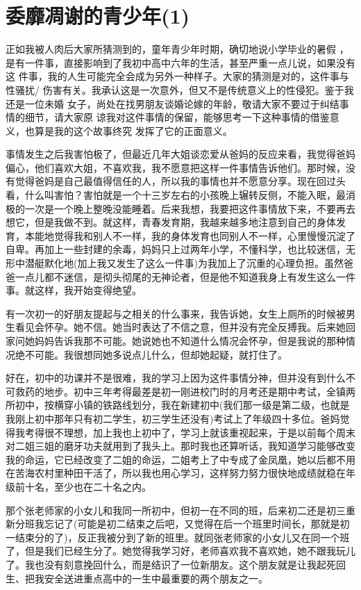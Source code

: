 \documentclass[12pt]{book}
\begin{document}
\section{委靡凋谢的青少年(1)}
\label{sec-2-5}

        正如我被人肉后大家所猜测到的，童年青少年时期，确切地说小学毕业的暑假
，是有一件事，直接影响到了我初中高中六年的生活，甚至严重一点儿说，如果没有这
件事，我的人生可能完全会成为另外一种样子。大家的猜测是对的，这件事与性骚扰/
伤害有关。我承认这是一次意外，但又不是传统意义上的性侵犯。鉴于我还是一位未婚
女子，尚处在找男朋友谈婚论嫁的年龄，敬请大家不要过于纠结事情的细节，请大家原
谅我对这件事情的保留，能够思考一下这种事情的借鉴意义，也算是我的这个故事终究
发挥了它的正面意义。

事情发生之后我害怕极了，但最近几年大姐谈恋爱从爸妈的反应来看，我觉得爸妈偏心，他们喜欢大姐，不喜欢我，我不愿意把这样一件事情告诉他们。那时候，没有觉得爸妈是自己最值得信任的人，所以我的事情也并不愿意分享。现在回过头看，什么叫害怕？害怕就是一个十三岁左右的小孩晚上辗转反侧，不能入眠，最消极的一次是一个晚上整晚没能睡着。后来我想，我要把这件事情放下来，不要再去想它，但是我做不到。就这样，青春发育期，我越来越多地注意到自己的身体发育，本能地觉得我和别人不一样，我的身体发育也同别人不一样，心里慢慢沉淀了自卑。再加上一些封建的余毒，妈妈只上过两年小学，不懂科学，也比较迷信，无形中潜艇默化地(加上我又发生了这么一件事)为我加上了沉重的心理负担。虽然爸爸一点儿都不迷信，是彻头彻尾的无神论者，但是他不知道我身上有发生这么一件事。就这样，我开始变得绝望。

有一次初一的好朋友提起与之相关的什么事来，我告诉她，女生上厕所的时候被男生看见会怀孕。她不信。她当时表达了不信之意，但并没有完全反搏我。后来她回家问她妈妈告诉我那不可能。她说她也不知道什么情况会怀孕，但是我说的那种情况绝不可能。我很想同她多说点儿什么，但却她起疑，就打住了。

好在，初中的功课并不是很难，我的学习上因为这件事情分神，但并没有到什么不可救药的地步。初中三年考得最差是初一刚进校门时的月考还是期中考试，全镇两所初中，按横穿小镇的铁路线划分，我在新建初中(我们那一级是第二级，也就是我刚上初中那年只有初二学生，初三学生还没有)考试上了年级四十多位。爸妈觉得我考得很不理想，加上我也上初中了，学习上就该重视起来，于是以前每个周末对二姐三姐的磨牙功夫就用到了我头上。那时我也还算听话，我知道学习能够改变我的命运，它已经改变了二姐的命运，二姐考上了中专成了金凤凰，她以后都不用在苦海农村里种田干活了，所以我也用心学习，这样努力努力很快地成绩就稳在年级前十名，至少也在二十名之内。

那个张老师家的小女儿和我同一所初中，但初一在不同的班，后来初二还是初三重新分班我忘记了(可能是初二结束之后吧，又觉得在后一个班里时间长，那就是初一结束分的了)，反正我被分到了新的班里。就同张老师家的小女儿又在同一个班了，但是我们已经生分了。她觉得我学习好，老师喜欢我不喜欢她，她不跟我玩儿了。我也没有刻意挽回什么，而是结识了一位新朋友。这个朋友就是让我起死回生、把我安全送进重点高中的一生中最重要的两个朋友之一。
\end{document}
